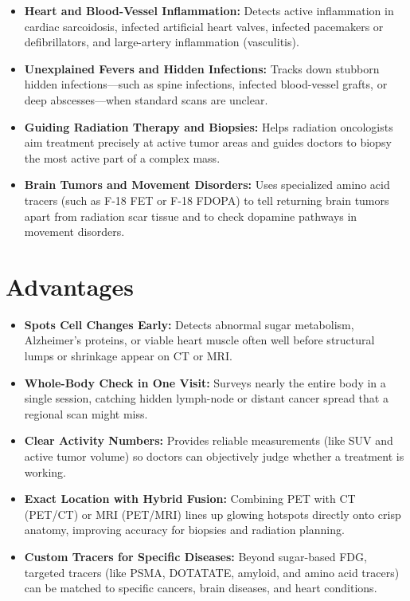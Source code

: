 \begin{itemize}
    \item \textbf{Heart and Blood-Vessel Inflammation:} Detects active inflammation in cardiac sarcoidosis, infected artificial heart valves, infected pacemakers or defibrillators, and large-artery inflammation (vasculitis).
    \item \textbf{Unexplained Fevers and Hidden Infections:} Tracks down stubborn hidden infections---such as spine infections, infected blood-vessel grafts, or deep abscesses---when standard scans are unclear.
    \item \textbf{Guiding Radiation Therapy and Biopsies:} Helps radiation oncologists aim treatment precisely at active tumor areas and guides doctors to biopsy the most active part of a complex mass.
    \item \textbf{Brain Tumors and Movement Disorders:} Uses specialized amino acid tracers (such as F-18 FET or F-18 FDOPA) to tell returning brain tumors apart from radiation scar tissue and to check dopamine pathways in movement disorders.
\end{itemize}

\section{Advantages}

\begin{itemize}
    \item \textbf{Spots Cell Changes Early:} Detects abnormal sugar metabolism, Alzheimer's proteins, or viable heart muscle often well before structural lumps or shrinkage appear on CT or MRI.
    \item \textbf{Whole-Body Check in One Visit:} Surveys nearly the entire body in a single session, catching hidden lymph-node or distant cancer spread that a regional scan might miss.
    \item \textbf{Clear Activity Numbers:} Provides reliable measurements (like SUV and active tumor volume) so doctors can objectively judge whether a treatment is working.
    \item \textbf{Exact Location with Hybrid Fusion:} Combining PET with CT (PET/CT) or MRI (PET/MRI) lines up glowing hotspots directly onto crisp anatomy, improving accuracy for biopsies and radiation planning.
    \item \textbf{Custom Tracers for Specific Diseases:} Beyond sugar-based FDG, targeted tracers (like PSMA, DOTATATE, amyloid, and amino acid tracers) can be matched to specific cancers, brain diseases, and heart conditions.
\end{itemize}

